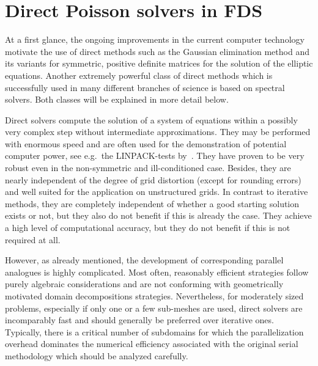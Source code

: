 
\section{Direct Poisson solvers in FDS} 
\label{SEC_SCARC_direct_solvers}
At a first glance, the ongoing improvements in the current computer technology motivate the use of direct methods such as the Gaussian elimination method and its variants for symmetric, positive definite matrices for the solution of the elliptic equations. Another extremely powerful class of direct methods which is successfully used in many different branches of science is based on spectral solvers. 
Both classes will be explained in more detail below.

Direct solvers compute the solution of a system of equations within a possibly very complex step without intermediate approximations. They may be performed with enormous speed and are often used for the demonstration of potential computer power, see e.g.\ the LINPACK-tests by~\cite{Dongarra:1998}.
They have proven to be very robust even in the non-symmetric and ill-conditioned case. Besides, they are nearly independent of the  degree of grid distortion (except for rounding errors) and well suited for the application on unstructured grids.  
In contrast to iterative methods, they are completely independent of whether a good starting solution exists or not, but they also do not benefit if this is already the case. They achieve a high level of computational accuracy, but they do not benefit if this is not required at all.

However, as already mentioned, the development of corresponding parallel analogues is highly complicated.
Most often, reasonably efficient strategies follow purely algebraic considerations
and are not conforming with geometrically motivated domain decompositions strategies.
Nevertheless, for  moderately sized problems, especially if only one or a few sub-meshes are used, direct solvers are incomparably fast and should generally be preferred over iterative ones.
Typically, there is a critical number of subdomains for which the parallelization overhead dominates the numerical efficiency associated with the original serial methodology which should be analyzed carefully.
 
